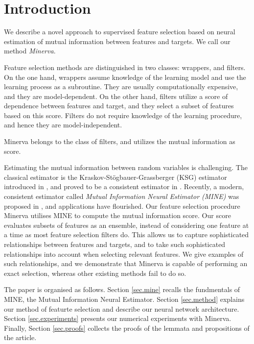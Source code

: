\section{Introduction}
We describe 
a novel approach to supervised feature selection 
based on 
neural estimation of mutual information 
between
features 
and 
targets.
We call our method 
\emph{Minerva}.


Feature selection methods
are distinguished in
two classes: 
wrappers,
and
filters.
On the one hand,
wrappers
assume 
knowledge of the learning model
and use the learning process as a subroutine. 
They are usually computationally expensive,
and they are model-dependent.
On the other hand,
filters 
utilize a score of dependence between features and target,
and they select a subset of features based on this score.
Filters
do not require knowledge of the learning procedure,
and hence they are model-independent.

Minerva belongs to the class of filters,
and utilizes the mutual information as score.

Estimating the mutual information between random variables
is challenging. 
The classical estimator is the
Kraskov-St{\"o}gbauer-Grassberger (KSG) estimator
introduced in \cite{KSG04est},
and proved to be a consistent estimator in
\cite{GOV18dem}.
Recently, 
a modern, consistent estimator 
called 
\emph{Mutual Information Neural Estimator (MINE)}
was proposed
in
\cite{BBROBCH18mut},
and applications have flourished.
Our feature selection procedure Minerva
utilises MINE to compute the mutual information score. 
Our score
evaluates subsets of features as an ensemble,
instead of considering one feature at a time
as most feature selection filters do.
This allows us to 
capture sophisticated relationships
between features and targets,
and 
to take such sophisticated relationships
into account when selecting relevant features.
We give examples of such relationships,
and we demonstrate that
Minerva is capable of performing an exact selection,
whereas other existing methods fail to do so.


The paper is organised as follows.
Section \ref{sec.mine}
recalls the fundmentals of MINE,
the Mutual Information Neural Estimator. 
Section \ref{sec.method}
explains our method of featurte selection 
and
describe our neural network architecture.
Section \ref{sec.experiments}
presents our numerical experiments with Minerva.
Finally, 
Section \ref{sec.proofs}
collects the proofs of the lemmata and propositions of the article.



